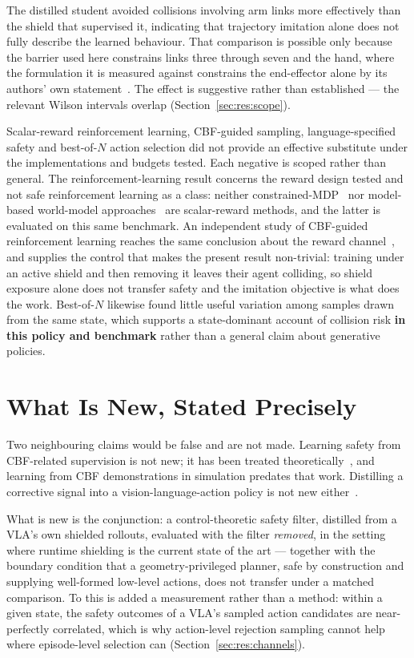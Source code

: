 \documentclass[a4paper,11pt]{report}
\begin{document}
The distilled student avoided collisions involving arm links more effectively than the shield that
supervised it, indicating that trajectory imitation alone does not fully describe the learned
behaviour. That comparison is possible only because the barrier used here constrains links three
through seven and the hand, where the formulation it is measured against constrains the
end-effector alone by its authors' own statement~\cite{vlsa2026}. The effect is suggestive rather
than established --- the relevant Wilson intervals overlap (Section~\ref{sec:res:scope}).

Scalar-reward reinforcement learning, CBF-guided sampling, language-specified safety and
best-of-$N$ action selection did not provide an effective substitute under the implementations and
budgets tested. Each negative is scoped rather than general. The reinforcement-learning result
concerns the reward design tested and not safe reinforcement learning as a class: neither
constrained-MDP~\cite{safevla} nor model-based world-model approaches~\cite{safedojo} are
scalar-reward methods, and the latter is evaluated on this same benchmark. An independent study of
CBF-guided reinforcement learning reaches the same conclusion about the reward
channel~\cite{guerrier2025guardrails}, and supplies the control that makes the present result
non-trivial: training under an active shield and then removing it leaves their agent colliding, so
shield exposure alone does not transfer safety and the imitation objective is what does the work.
Best-of-$N$ likewise found little useful variation among samples drawn from the same state, which
supports a state-dominant account of collision risk \textbf{in this policy and benchmark} rather
than a general claim about generative policies.

\section*{What Is New, Stated Precisely}

Two neighbouring claims would be false and are not made. Learning safety from CBF-related
supervision is not new; it has been treated theoretically~\cite{cosner2022il_cbf}, and learning
from CBF demonstrations in simulation predates that work. Distilling a corrective signal into a
vision-language-action policy is not new either~\cite{wang2026roadvla}.

What is new is the conjunction: a control-theoretic safety filter, distilled from a VLA's own
shielded rollouts, evaluated with the filter \emph{removed}, in the setting where runtime shielding
is the current state of the art --- together with the boundary condition that a geometry-privileged
planner, safe by construction and supplying well-formed low-level actions, does not transfer under
a matched comparison. To this is added a measurement rather than a method: within a given state,
the safety outcomes of a VLA's sampled action candidates are near-perfectly correlated, which is
why action-level rejection sampling cannot help where episode-level selection can
(Section~\ref{sec:res:channels}).
\end{document}

